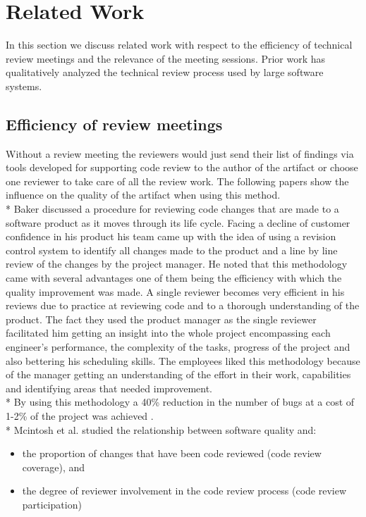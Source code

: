 \section{Related Work}
In this section we discuss related work with respect to the efficiency of technical review meetings and the relevance of the meeting sessions. Prior work has qualitatively analyzed the technical review process used by large software systems.

\subsection{Efficiency of review meetings}
Without a review meeting the reviewers would just send their list of findings via tools developed for supporting code review to the author of the artifact or choose one reviewer to take care of all the review work. The following papers show the influence on the quality of the artifact when using this method. \\* 
Baker discussed a procedure for reviewing code changes that are made to a software product as it moves through its life cycle. Facing a decline of customer confidence in his product his team came up with the idea of using a revision control system to identify all changes made to the product and a line by line review of the changes by the project manager. He noted that this methodology came with several advantages one of them being the efficiency with which the quality improvement was made. A single reviewer becomes very efficient in his reviews due to practice at reviewing code and to a thorough understanding of the product. The fact they used the product manager as the single reviewer facilitated him getting an insight into the whole project encompassing each engineer's performance, the complexity of the tasks, progress of the project and also bettering his scheduling skills. The employees liked this methodology because of the manager getting an understanding of the effort in their work, capabilities and identifying areas that needed improvement. \\*
By using this methodology a 40\% reduction in the number of bugs at a cost of 1-2\% of the project was achieved \cite{Baker:1997:CRE:253228.253461}. \\*
Mcintosh et al. studied the relationship between software quality and:
\begin{itemize}
	\item the proportion of changes that have been code reviewed (code review coverage), and
	\item the degree of reviewer involvement in the code review process (code review participation)
\end{itemize}
